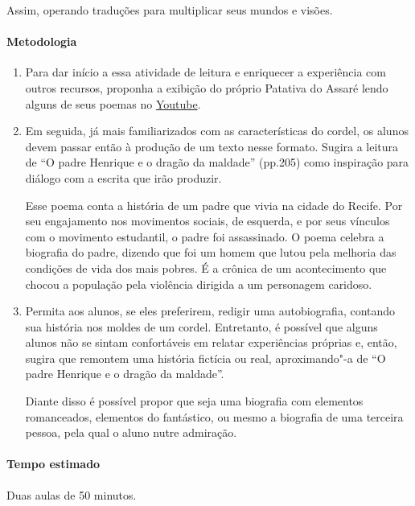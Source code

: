 \documentclass[12pt]{extarticle}
\begin{document}
Assim, operando traduções para multiplicar seus mundos e visões.

\paragraph{Metodologia}

\begin{enumerate}
\item
Para dar início a essa atividade de leitura e enriquecer a experiência 
com outros recursos, proponha a exibição do próprio Patativa do Assaré 
lendo alguns de seus poemas no \href{https://www.youtube.com/watch?v=RTEfYnMNNpc&ab_channel=IrandiHolanda}{Youtube}.

\item
Em seguida, já mais familiarizados com as características do cordel, os
alunos devem passar então à produção de um texto nesse formato. Sugira a 
leitura de ``O padre Henrique e o dragão da maldade'' (pp.205) como 
inspiração para diálogo com a escrita que irão produzir. 

Esse poema conta a história de um padre que vivia na cidade
do Recife. Por seu engajamento nos movimentos sociais, de
esquerda, e por seus vínculos com o movimento estudantil,
o padre foi assassinado. O poema celebra a biografia do
padre, dizendo que foi um homem que lutou pela melhoria
das condições de vida dos mais pobres. É a crônica de
um acontecimento que chocou a população pela violência
dirigida a um personagem caridoso.

\item
Permita aos alunos, se eles preferirem, redigir uma autobiografia, 
contando sua história nos moldes de um cordel. Entretanto, é possível 
que alguns alunos não se sintam confortáveis em relatar experiências 
próprias e, então, sugira que remontem uma história fictícia ou real, 
aproximando"-a de ``O padre Henrique e o dragão da maldade''.

Diante disso é possível propor que seja uma biografia com elementos
romanceados, elementos do fantástico, ou mesmo a biografia de uma
terceira pessoa, pela qual o aluno nutre admiração. 

\end{enumerate}

\paragraph{Tempo estimado} Duas aulas de 50 minutos. 
\end{document}
